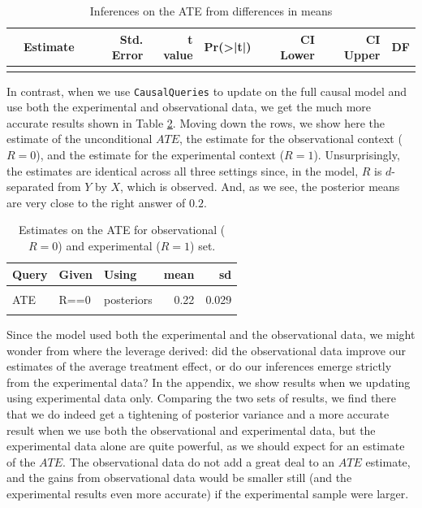 \documentclass[
  12pt,
]{book}
\begin{document}
\begin{table}

\caption{\label{tab:fusiondim}Inferences on the ATE from differences in means}
\centering
\begin{tabular}[t]{lrrrrrrr}
\toprule
  & Estimate & Std. Error & t value & Pr(>|t|) & CI Lower & CI Upper & DF\\
\midrule
\cellcolor{gray!6}{X} & \cellcolor{gray!6}{0.831} & \cellcolor{gray!6}{0.027} & \cellcolor{gray!6}{30.37} & \cellcolor{gray!6}{0} & \cellcolor{gray!6}{0.777} & \cellcolor{gray!6}{0.885} & \cellcolor{gray!6}{188}\\
\bottomrule
\end{tabular}
\end{table}

In contrast, when we use \texttt{CausalQueries} to update on the full causal model and use both the experimental and observational data, we get the much more accurate results shown in Table \ref{tab:fusionCQ}. Moving down the rows, we show here the estimate of the unconditional \(ATE\), the estimate for the observational context (\(R=0\)), and the estimate for the experimental context (\(R=1\)). Unsurprisingly, the estimates are identical across all three settings since, in the model, \(R\) is \(d\)-separated from \(Y\) by \(X\), which is observed. And, as we see, the posterior means are very close to the right answer of \(0.2\).

\begin{table}

\caption{\label{tab:fusionCQ}Estimates on the ATE for observational ($R=0$) and experimental ($R=1$) set.}
\centering
\begin{tabular}[t]{lllrr}
\toprule
Query & Given & Using & mean & sd\\
\midrule
\cellcolor{gray!6}{ATE} & \cellcolor{gray!6}{-} & \cellcolor{gray!6}{posteriors} & \cellcolor{gray!6}{0.22} & \cellcolor{gray!6}{0.029}\\
ATE & R==0 & posteriors & 0.22 & 0.029\\
\cellcolor{gray!6}{ATE} & \cellcolor{gray!6}{R==1} & \cellcolor{gray!6}{posteriors} & \cellcolor{gray!6}{0.22} & \cellcolor{gray!6}{0.029}\\
\bottomrule
\end{tabular}
\end{table}

Since the model used both the experimental and the observational data, we might wonder from where the leverage derived: did the observational data improve our estimates of the average treatment effect, or do our inferences emerge strictly from the experimental data? In the appendix, we show results when we updating using experimental data only.
Comparing the two sets of results, we find there that we do indeed get a tightening of posterior variance and a more accurate result when we use both the observational and experimental data, but the experimental data alone are quite powerful, as we should expect for an estimate of the \(ATE\). The observational data do not add a great deal to an \(ATE\) estimate, and the gains from observational data would be smaller still (and the experimental results even more accurate) if the experimental sample were larger.
\end{document}
